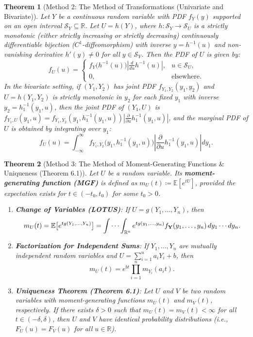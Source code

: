 \documentclass[11pt, letterpaper]{article}
\newtheorem{theorem}{Theorem}[section]
\theoremstyle{definition}
\theoremstyle{remark}
\newcommand{\R}{\mathbb{R}}
\newcommand{\E}{\mathbb{E}}
\begin{document}
\begin{theorem}[Method 2: The Method of Transformations (Univariate and Bivariate)]
\label{thm:transformation_method}
Let $Y$ be a continuous random variable with PDF $f_Y(y)$ supported on an open interval $\mathcal{S}_Y \subseteq \R$. Let $U = h(Y)$, where $h: \mathcal{S}_Y \to \mathcal{S}_U$ is a strictly monotonic (either strictly increasing or strictly decreasing) continuously differentiable bijection ($C^1$-diffeomorphism) with inverse $y = h^{-1}(u)$ and non-vanishing derivative $h'(y) \neq 0$ for all $y \in \mathcal{S}_Y$. Then the PDF of $U$ is given by:
\[
    f_U(u) = \begin{cases}
        \displaystyle f_Y\big(h^{-1}(u)\big) \left| \frac{d}{du} h^{-1}(u) \right|, & u \in \mathcal{S}_U, \\[8pt]
        0, & \text{elsewhere.}
    \end{cases}
\]
In the bivariate setting, if $(Y_1, Y_2)$ has joint PDF $f_{Y_1, Y_2}(y_1, y_2)$ and $U = h(Y_1, Y_2)$ is strictly monotonic in $y_2$ for each fixed $y_1$ with inverse $y_2 = h_1^{-1}(y_1, u)$, then the joint PDF of $(Y_1, U)$ is $f_{Y_1, U}(y_1, u) = f_{Y_1, Y_2}(y_1, h_1^{-1}(y_1, u)) \left|\frac{\partial}{\partial u} h_1^{-1}(y_1, u)\right|$, and the marginal PDF of $U$ is obtained by integrating over $y_1$:
\[
    f_U(u) = \int_{-\infty}^{\infty} f_{Y_1, Y_2}\big(y_1, h_1^{-1}(y_1, u)\big) \left| \frac{\partial}{\partial u} h_1^{-1}(y_1, u) \right| dy_1.
\]
\end{theorem}

\begin{theorem}[Method 3: The Method of Moment-Generating Functions \& Uniqueness (Theorem 6.1)]
\label{thm:mgf_uniqueness}
Let $U$ be a random variable. Its \textbf{moment-generating function (MGF)} is defined as $m_U(t) \coloneqq \E[e^{tU}]$, provided the expectation exists for $t \in (-t_0, t_0)$ for some $t_0 > 0$. 
\begin{enumerate}[label=(\roman*)]
    \item \textbf{Change of Variables (LOTUS)}: If $U = g(Y_1, \dots, Y_n)$, then
    \[
        m_U(t) = \E\big[e^{t g(Y_1, \dots, Y_n)}\big] = \idotsint_{\R^n} e^{t g(y_1, \dots, y_n)} f_{\mathbf{Y}}(y_1, \dots, y_n) \, dy_1 \cdots dy_n.
    \]
    \item \textbf{Factorization for Independent Sums}: If $Y_1, \dots, Y_n$ are mutually independent random variables and $U = \sum_{i=1}^n a_i Y_i + b$, then
    \[
        m_U(t) = e^{bt} \prod_{i=1}^n m_{Y_i}(a_i t).
    \]
    \item \textbf{Uniqueness Theorem (Theorem 6.1)}: Let $U$ and $V$ be two random variables with moment-generating functions $m_U(t)$ and $m_V(t)$, respectively. If there exists $\delta > 0$ such that $m_U(t) = m_V(t) < \infty$ for all $t \in (-\delta, \delta)$, then $U$ and $V$ have identical probability distributions (i.e., $F_U(u) = F_V(u)$ for all $u \in \R$).
\end{enumerate}
\end{theorem}
\end{document}
